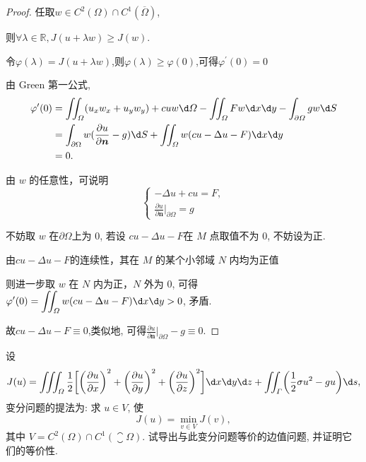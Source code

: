 \begin{proof}
	任取$w\in C^2(\varOmega)\cap C^1(\overline{\varOmega})$,
	
	则$\forall\lambda\in\mathbb{R},J(u+\lambda w)\geq J(w)$.
	
	令$\varphi(\lambda)=J(u+\lambda w)$,则$\varphi(\lambda)\geq\varphi(0)$,可得$\varphi^\prime(0)=0$
	
	由 Green 第一公式,
	$$\begin{aligned}
		\varphi^{\prime}(0)&=\iint_{\varOmega}(u_{x}w_{x}+u_{y}w_{y})+cuw\d\varOmega-\iint_{\varOmega}Fw\d x\d y-\int_{\partial\varOmega}gw\d S\\
		&=\int_{\partial\Omega}w(\frac{\partial u}{\partial\bm{n}}-g)\d S+\iint_{\varOmega}w(cu-\Delta u-F)\d x\d y\\
		&=0.
	\end{aligned}$$
	
	由 $w$ 的任意性，可说明
	$$\begin{cases}
		-\Delta u+cu=F,\\
		\frac{\partial u}{\partial\bm{n}}\Big|_{\partial\varOmega}=g
	\end{cases}$$
	
	不妨取 $w$ 在$\partial\varOmega$上为 $0$, 若设 $cu-\Delta u-F$在 $M$ 点取值不为 $0$, 不妨设为正.
	
	由$cu-\Delta u-F$的连续性，其在 $M$ 的某个小邻域 $N$ 内均为正值
	
	则进一步取 $w$ 在 $N$ 内为正，$N$ 外为 $0$, 可得$\displaystyle\varphi^\prime(0)=\iint_\varOmega w(cu-\Delta u-F)\d x\d y>0$, 矛盾.

	故$cu-\Delta u-F\equiv0$,类似地, 可得$\displaystyle\frac{\partial u}{\partial\bm{n}}\bigg|_{\partial\varOmega}-g\equiv0$.
\end{proof}
\begin{exercise}[12]
  设
  \[J(u) = \iiint_{\varOmega} \frac12 \biggl[\biggl(\frac{\partial u}{\partial x}\biggr)^2
    + \biggl(\frac{\partial u}{\partial y}\biggr)^2
    + \biggl(\frac{\partial u}{\partial z}\biggr)^2\biggr] \d x\d y\d z
    + \iint_{\varGamma} \biggl(\frac12 \sigma u^2 - gu\biggr) \d s,\]
  变分问题的提法为: 求 $u\in V$, 使
  \[J(u) = \min_{v\in V} J(v),\]
  其中 $V = C^2(\varOmega)\cap C^1(\closure{\varOmega})$.
  试导出与此变分问题等价的边值问题, 并证明它们的等价性.
\end{exercise}

